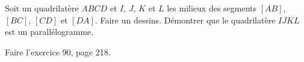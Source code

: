 
\begin{exercice}\label{exosmath-0085}

    Soit un quadrilatère \( ABCD\) et \( I\), \( J\), \( K\) et \( L\) les milieux des segments \( [AB]\), \( [BC]\), \( [CD]\) et \( [DA]\). Faire un dessins. Démontrer que le quadrilatère \( IJKL\) est un parallélogramme.

    Faire l'exercice 90, page 218.

\end{exercice}
